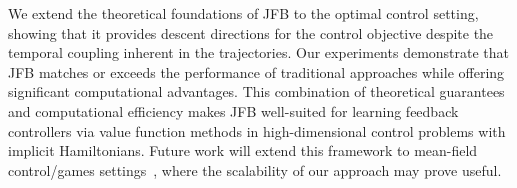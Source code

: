 \documentclass[letterpaper, 10 pt, conference]{ieeeconf}  %
\begin{document}
    We extend the theoretical foundations of JFB to the optimal control setting, showing that it provides descent directions for the control objective despite the temporal coupling inherent in the trajectories. 
    Our experiments demonstrate that JFB matches or exceeds the performance of traditional approaches while offering significant computational advantages. 
    This combination of theoretical guarantees and computational efficiency makes JFB well-suited for learning feedback controllers via value function methods in high-dimensional control problems with implicit Hamiltonians. Future work will extend this framework to mean-field control/games settings~\cite{lasry2007mean, vidal2025kernel, agrawal2022random, lauriere2022learning, wang2025primal, chow2022numerical, yang2023relative}, where the scalability of our approach may prove useful.

    
\end{document}
